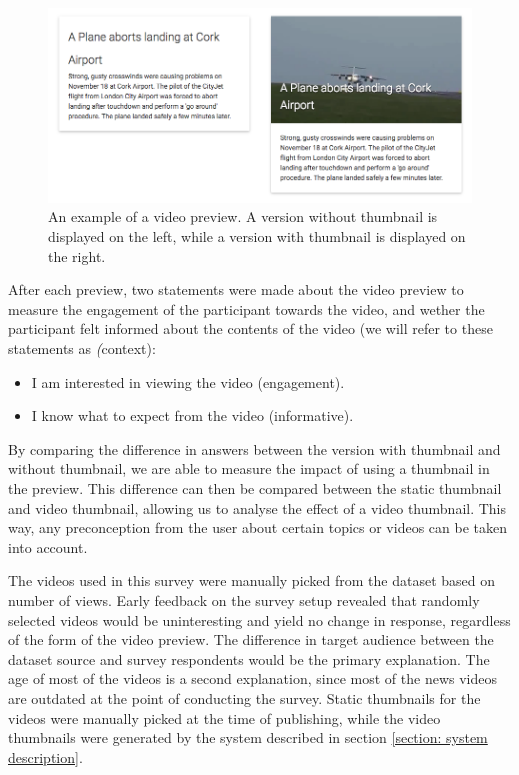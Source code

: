 \documentclass{../resources/sig-alternate-05-2015}
\begin{document}
\begin{figure}[h]
  \includegraphics[width=\linewidth]{resources/preview-combined.png}
  \caption{An example of a video preview. A version without thumbnail is displayed on the left, while a version with thumbnail is displayed on the right.}
  \label{figure: survey preview}
\end{figure}

After each preview, two statements were made about the video preview to measure the engagement of the participant towards the video, and wether the participant felt informed about the contents of the video (we will refer to these statements as \textit(context):

\begin{itemize}
	\item I am interested in viewing the video (engagement).
	\item I know what to expect from the video (informative).
\end{itemize}

By comparing the difference in answers between the version with thumbnail and without thumbnail, we are able to measure the impact of using a thumbnail in the preview. This difference can then be compared between the static thumbnail and video thumbnail, allowing us to analyse the effect of a video thumbnail. This way, any preconception from the user about certain topics or videos can be taken into account.

The videos used in this survey were manually picked from the dataset based on number of views. Early feedback on the survey setup revealed that randomly selected videos would be uninteresting and yield no change in response, regardless of the form of the video preview. The difference in target audience between the dataset source and survey respondents would be the primary explanation. The age of most of the videos is a second explanation, since most of the news videos are outdated at the point of conducting the survey. Static thumbnails for the videos were manually picked at the time of publishing, while the video thumbnails were generated by the system described in section \ref{section: system description}.
\end{document}
